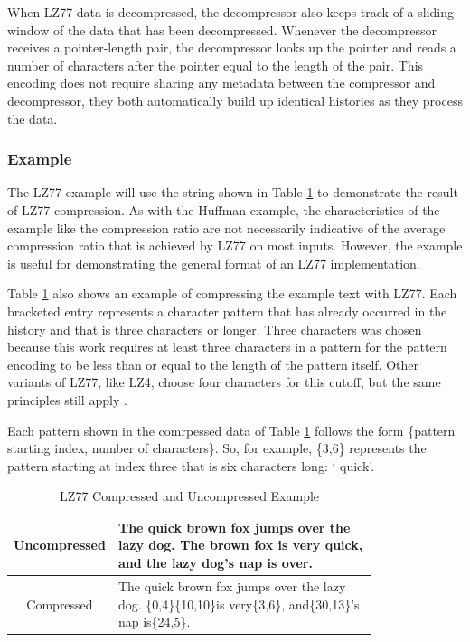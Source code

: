 \documentclass[doublespace,nopageskip]{VTthesis}
\begin{document}
When LZ77 data is decompressed, the decompressor also keeps track of a sliding window of the data that has been decompressed. Whenever the decompressor receives a pointer-length pair, the decompressor looks up the pointer and reads a number of characters after the pointer equal to the length of the pair. This encoding does not require sharing any metadata between the compressor and decompressor, they both automatically build up identical histories as they process the data.

\subsubsection{Example}\label{sss:lz77_example}
The LZ77 example will use the string shown in Table \ref{tab:lz77_compressed_and_uncompressed} to demonstrate the result of LZ77 compression. As with the Huffman example, the characteristics of the example like the compression ratio are not necessarily indicative of the average compression ratio that is achieved by LZ77 on most inputs. However, the example is useful for demonstrating the general format of an LZ77 implementation.

Table \ref{tab:lz77_compressed_and_uncompressed} also shows an example of compressing the example text with LZ77. Each bracketed entry represents a character pattern that has already occurred in the history and that is three characters or longer. Three characters was chosen because this work requires at least three characters in a pattern for the pattern encoding to be less than or equal to the length of the pattern itself. Other variants of LZ77, like LZ4, choose four characters for this cutoff, but the same principles still apply \cite{lz4}.

Each pattern shown in the comrpessed data of Table \ref{tab:lz77_compressed_and_uncompressed} follows the form \{pattern starting index, number of characters\}. So, for example, \{3,6\} represents the pattern starting at index three that is six characters long: ` quick'.

\begin{table}[htb]
	\centering
	\caption{LZ77 Compressed and Uncompressed Example}
	\begin{tabular}{cp{0.8\linewidth}}
	    \toprule
	    Uncompressed & The quick brown fox jumps over the lazy dog. The brown fox is very quick, and the lazy dog's nap is over.\\
	    \midrule
	    Compressed & The quick brown fox jumps over the lazy dog. \{0,4\}\{10,10\}is very\{3,6\}, and\{30,13\}'s nap is\{24,5\}.\\
	    \bottomrule
	\end{tabular}
	\label{tab:lz77_compressed_and_uncompressed}
\end{table}
\end{document}
